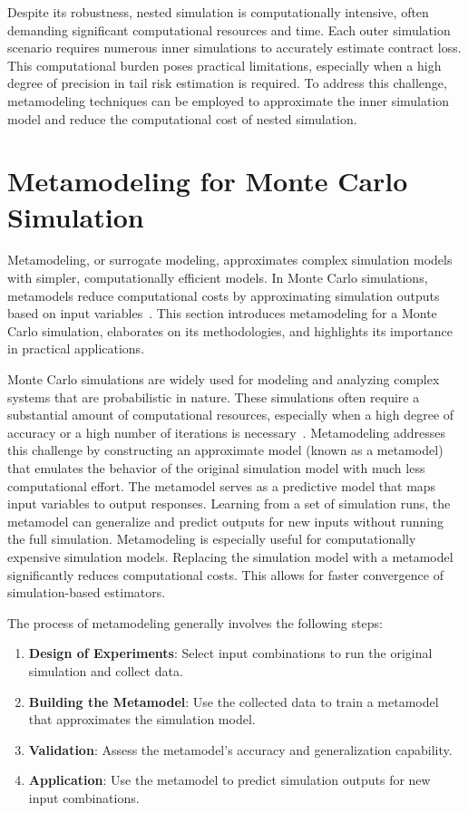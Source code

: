 Despite its robustness, nested simulation is computationally intensive, often demanding significant computational resources and time.
Each outer simulation scenario requires numerous inner simulations to accurately estimate contract loss.
This computational burden poses practical limitations, especially when a high degree of precision in tail risk estimation is required.
To address this challenge, metamodeling techniques can be employed to approximate the inner simulation model and reduce the computational cost of nested simulation.

\section{Metamodeling for Monte Carlo Simulation}

Metamodeling, or surrogate modeling, approximates complex simulation models with simpler, computationally efficient models.
In Monte Carlo simulations, metamodels reduce computational costs by approximating simulation outputs based on input variables~\citep{kleijnen2018design}.
This section introduces metamodeling for a Monte Carlo simulation, elaborates on its methodologies, and highlights its importance in practical applications.

Monte Carlo simulations are widely used for modeling and analyzing complex systems that are probabilistic in nature.
These simulations often require a substantial amount of computational resources, especially when a high degree of accuracy or a high number of iterations is necessary~\citep{glasserman2004monte}.
Metamodeling addresses this challenge by constructing an approximate model (known as a metamodel) that emulates the behavior of the original simulation model with much less computational effort.
The metamodel serves as a predictive model that maps input variables to output responses.
Learning from a set of simulation runs, the metamodel can generalize and predict outputs for new inputs without running the full simulation.
Metamodeling is especially useful for computationally expensive simulation models.
Replacing the simulation model with a metamodel significantly reduces computational costs.
This allows for faster convergence of simulation-based estimators.

The process of metamodeling generally involves the following steps:

\begin{enumerate} 
    \item \textbf{Design of Experiments}: Select input combinations to run the original simulation and collect data.
    \item \textbf{Building the Metamodel}: Use the collected data to train a metamodel that approximates the simulation model.
    \item \textbf{Validation}: Assess the metamodel's accuracy and generalization capability.
    \item \textbf{Application}: Use the metamodel to predict simulation outputs for new input combinations.
\end{enumerate}

